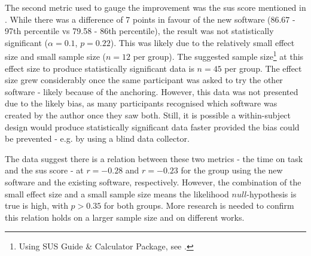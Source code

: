 {The second metric used to gauge the improvement was the \gls{sus} score mentioned in .
While there was a difference of 7 points in favour of the new software (86.67 - 97th percentile vs 79.58 - 86th percentile), the result was not statistically significant ($\alpha=0.1$, $p=0.22$).
This was likely due to the relatively small effect size and small sample size ($n=12$ per group).
The suggested sample size\footnote{Using SUS Guide \& Calculator Package, see .} at this effect size to produce statistically significant data is $n=45$ per group.
The effect size grew considerably once the same participant was asked to try the other software - likely because of the anchoring.
However, this data was not presented due to the likely bias, as many participants recognised which software was created by the author once they saw both.
Still, it is possible a within-subject design would produce statistically significant data faster provided the bias could be prevented - e.g. by using a blind data collector.

The data suggest there is a relation between these two metrics - the time on task and the \gls{sus} score - at $r=-0.28$ and $r=-0.23$ for the group using the new software and the existing software, respectively.
However, the combination of the small effect size and a small sample size means the likelihood $null$-hypothesis is true is high, with $p > 0.35$ for both groups.
More research is needed to confirm this relation holds on a larger sample size and on different works.

}
